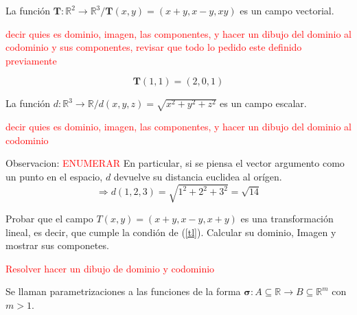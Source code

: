   
    \begin{example}  \label{ej:campoVectorial}
        La función $\boldsymbol{T}:\mathbb{R}^2 \rightarrow \mathbb{R}^3 / \boldsymbol{T}(x,y) = (x+y,x-y,xy)$
        es un campo vectorial. 
       
        \textcolor{red}{decir quies es dominio, imagen, las componentes, y hacer un dibujo del dominio al codominio y sus componentes, revisar que todo lo pedido este definido previamente }
       
        \begin{equation*}
            \boldsymbol{T}(1,1)=(2,0,1)
        \end{equation*}
      
    \end{example}






\begin{example}
        La función $d:\mathbb{R}^3 \rightarrow \mathbb{R} / d(x,y,z) = \sqrt{x^2+y^2+z^2}$
        es un campo escalar.  
    \end{example} 
   
     \textcolor{red}{decir quies es dominio, imagen, las componentes, y hacer un dibujo del dominio al codominio }      
        
       Observacion: \textcolor{red}{ENUMERAR} En particular, si se piensa el vector argumento como un punto en el espacio, $d$ devuelve su distancia euclidea al orígen.
        \begin{equation*}
            \Rightarrow d(1,2,3)=\sqrt{1^2+2^2+3^2}=\sqrt{14}
        \end{equation*}
        \label{ej:campoEscalar}
  


    \begin{example}
    Probar que el campo $T(x,y) = (x+y,x-y,x+y)$  es una transformaci\'on lineal, es decir, que cumple  la condi\'on de   (\ref{tl}). Calcular su dominio, Imagen y mostrar sus componetes.
    
     \textcolor{red}{Resolver hacer un dibujo de dominio y codominio}
    
   \end{example}


\begin{definition} Se llaman parametrizaciones a las funciones de la forma $\boldsymbol{\sigma}:A\subseteq\mathbb{R}\rightarrow B\subseteq\mathbb{R}^m$ con $ m>1$.   
\end{definition}
   
